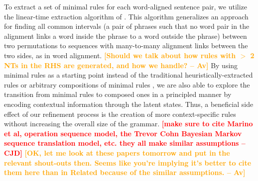 \documentclass[11pt]{article}
\newcommand{\cjd}[1]{\textcolor{red}{\textbf{[#1 --CJD] }}}
\newcommand{\shaycomment}[1]{\textcolor{blue}{#1 -- Shay}}
\newcommand{\avcomment}[1]{\textcolor{orange}{\textbf{[#1 -- Av]}}}
\begin{document}
To extract a set of minimal rules for each word-aligned sentence pair, we utilize the linear-time extraction algorithm of .  
This algorithm generalizes an approach for finding all common intervals (a pair of phrases such that no word pair in the alignment links a word inside the phrase to a word outside the phrase) between two permutations to sequences with many-to-many alignment links between the two sides, as in word alignment. 
\avcomment{Should we talk about how rules with $>$ 2 NTs in the RHS are generated, and how we handle?}
By using minimal rules as a starting point instead of the traditional heuristically-extracted rules \cite{Chiang2005} or arbitrary compositions of minimal rules \cite{Galley2006}, we are also able to explore the transition from minimal rules to composed ones in a principled manner by encoding contextual information through the latent states.   
Thus, a beneficial side effect of our refinement process is the creation of more context-specific rules without increasing the overall size of the grammar.
\cjd{make sure to cite Marino et al, operation sequence model, the Trevor Cohn Bayesian Markov sequence translation model, etc. they all make similar assumptions}
\avcomment{OK, let me look at these papers tomorrow and put in the relevant shout-outs then.  Seems like you're implying it's better to cite them here than in Related because of the similar assumptions.}
\end{document}
